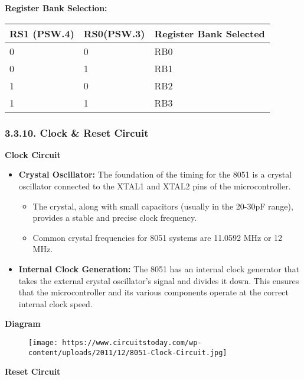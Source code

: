 \documentclass[
]{article}
\begin{document}
\textbf{Register Bank Selection:}

\begin{longtable}[]{@{}lll@{}}
\toprule
RS1 (PSW.4) & RS0(PSW.3) & Register Bank Selected \\
\midrule
\endhead
0 & 0 & RB0 \\
0 & 1 & RB1 \\
1 & 0 & RB2 \\
1 & 1 & RB3 \\
\bottomrule
\end{longtable}

\hypertarget{3310-clock--reset-circuit}{%
\subsubsection{3.3.10. Clock \& Reset
Circuit}\label{3310-clock--reset-circuit}}

\textbf{Clock Circuit}

\begin{itemize}
\item
  \textbf{Crystal Oscillator:} The foundation of the timing for the 8051
  is a crystal oscillator connected to the XTAL1 and XTAL2 pins of the
  microcontroller.

  \begin{itemize}
  \item
    The crystal, along with small capacitors (usually in the 20-30pF
    range), provides a stable and precise clock frequency.
  \item
    Common crystal frequencies for 8051 systems are 11.0592 MHz or 12
    MHz.
  \end{itemize}
\item
  \textbf{Internal Clock Generation:} The 8051 has an internal clock
  generator that takes the external crystal oscillator's signal and
  divides it down. This ensures that the microcontroller and its various
  components operate at the correct internal clock speed.
\end{itemize}

\textbf{Diagram}

\begin{figure}
\centering
\texttt{[image: https://www.circuitstoday.com/wp-content/uploads/2011/12/8051-Clock-Circuit.jpg]}
\caption{}
\end{figure}

\textbf{Reset Circuit}
\end{document}
